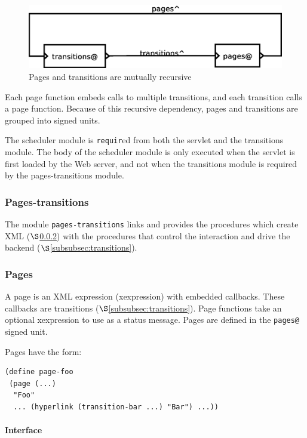 \documentclass[a4paper]{article}
\begin{document}
\begin{figure}[ht]
\centering
\includegraphics[scale=.30]{units.eps}
\caption{Pages and transitions are mutually recursive}
\label{fig:layout}
\end{figure}

Each page function embeds calls to multiple transitions, and each transition
calls a page function. Because of this recursive dependency, pages and 
transitions are grouped into signed units.

The scheduler module is \verb|requir|ed from both the servlet and the
transitions module. The body of the scheduler module is only executed when the
servlet is first loaded by the Web server, and not when the transitions module
is required by the pages-transitions module.

\subsubsection{Pages-transitions}\label{subsubsec:pages-transitions}

The module \verb|pages-transitions| links and provides the procedures which
create XML ($\S$\ref{subsubsec:pages}) with the procedures that control the
interaction and drive the backend ($\S$\ref{subsubsec:transitions}).

\subsubsection{Pages}\label{subsubsec:pages}

A page is an XML expression (xexpression) with embedded callbacks. These callbacks
are transitions ($\S$\ref{subsubsec:transitions}). Page functions take an
optional xexpression to use as a status message. Pages are defined in the
\verb|pages@| signed unit.

Pages have the form:

\begin{verbatim}
(define page-foo 
 (page (...)
  "Foo"
  ... (hyperlink (transition-bar ...) "Bar") ...))
\end{verbatim}

\paragraph{Interface}\label{para:pages-interface}
\end{document}
